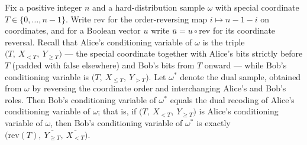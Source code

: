 \begin{theorem}
\label{CommunicationComplexity.Functions.Disjointness.RandomizedLowerBound.bobClaimConditioning_dualHardSample}
\leanok
{}
Fix a positive integer $n$ and a hard-distribution sample $\omega$ with special
coordinate $T \in \{0,\dots,n-1\}$. Write $\mathrm{rev}$ for the order-reversing map $i
\mapsto n-1-i$ on coordinates, and for a Boolean vector $u$ write $\bar u = u \circ
\mathrm{rev}$ for its coordinate reversal. Recall that Alice's conditioning variable of
$\omega$ is the triple $\bigl(T,\ X_{<T},\ Y_{\ge T}\bigr)$ — the special coordinate
together with Alice's bits strictly before $T$ (padded with $\mathrm{false}$ elsewhere)
and Bob's bits from $T$ onward — while Bob's conditioning variable is $\bigl(T,\ X_{\le
T},\ Y_{>T}\bigr)$. Let $\omega^\ast$ denote the dual sample, obtained from $\omega$ by
reversing the coordinate order and interchanging Alice's and Bob's roles. Then Bob's
conditioning variable of $\omega^\ast$ equals the dual recoding of Alice's conditioning
variable of $\omega$; that is, if $\bigl(T,\ X_{<T},\ Y_{\ge T}\bigr)$ is Alice's
conditioning variable of $\omega$, then Bob's conditioning variable of $\omega^\ast$ is
exactly $\bigl(\mathrm{rev}(T),\ \overline{Y_{\ge T}},\ \overline{X_{<T}}\bigr)$.
\end{theorem}

